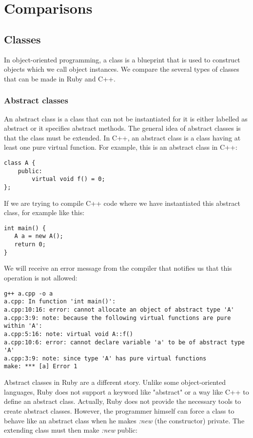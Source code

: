 \documentclass[10pt,a4paper,twocolumn]{article}
\begin{document}
\pagebreak
\section{Comparisons}

\subsection{Classes}
In object-oriented programming, a class is a blueprint that is used to construct objects which we call object instances. We compare the several types of classes that can be made in Ruby and C++.

\subsubsection{Abstract classes}
An abstract class is a class that can not be instantiated for it is either labelled as abstract or it specifies abstract methods. The general idea of abstract classes is that the class must be extended. In C++, an abstract class is a class having at least one pure virtual function. For example, this is an abstract class in C++:

\begin{lstlisting}
class A {
	public:
		virtual void f() = 0;
};
\end{lstlisting}

If we are trying to compile C++ code where we have instantiated this abstract class, for example like this:

\begin{lstlisting}
int main() {
   A a = new A();
   return 0;
}
\end{lstlisting}

We will receive an error message from the compiler that notifies us that this operation is not allowed:

\begin{lstlisting}
g++ a.cpp -o a
a.cpp: In function 'int main()':
a.cpp:10:16: error: cannot allocate an object of abstract type 'A'
a.cpp:3:9: note: because the following virtual functions are pure within 'A':
a.cpp:5:16: note: virtual void A::f()
a.cpp:10:6: error: cannot declare variable 'a' to be of abstract type 'A'
a.cpp:3:9: note: since type 'A' has pure virtual functions
make: *** [a] Error 1
\end{lstlisting}

Abstract classes in Ruby are a different story. Unlike some object-oriented languages, Ruby does not support a keyword like "abstract" or a way like C++ to define an abstract class. Actually, Ruby does not provide the necessary tools to create abstract classes. However, the programmer himself can force a class to behave like an abstract class when he makes \textit{:new} (the constructor) private. The extending class must then make \textit{:new} public:
\end{document}
